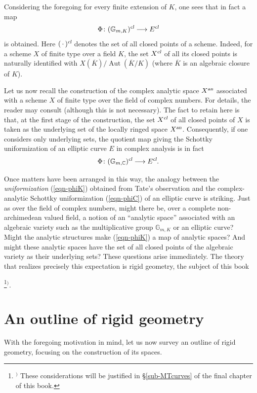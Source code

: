 \documentclass[a4paper,12pt, dvipdfmx]{jsbook}
\def\C{\mathbb{C}}
\def\G{\mathbb{G}}
\def\ovl#1{\overline{#1}}%
\def\cl{\mathop{\textsl{cl}}\nolimits}
\def\Aut{\mathop{\mathrm{Aut}}\nolimits}
\def\an{\textsl{an}}
\theoremstyle{plain}
\theoremstyle{definition}
\newcounter{chushaku}
\def\chu#1{\addtocounter{chushaku}{1}\footnote[\value{chushaku}]{${}^)$ #1}${}^)$}
\begin{document}
Considering the foregoing for every finite extension of $K$, one sees that in fact a map
\begin{equation}\label{eqn-phiK}
\Phi\colon(\G_{m,K})^{\cl}\longrightarrow E^{\cl}
\end{equation}
is obtained.
Here $(\,\cdot\,)^{\cl}$ denotes the set of all closed points of a scheme.
Indeed, for a scheme $X$ of finite type over a field $K$, the set $X^{\cl}$ of all its closed points is naturally identified with $X(\ovl{K})/\Aut(\ovl{K}/K)$ (where $\ovl{K}$ is an algebraic closure of $K$).

Let us now recall the construction of the complex analytic space $X^{\an}$ associated with a scheme $X$ of finite type over the field of complex numbers.
For details, the reader may consult \cite[Expos\'e XII]{SGA1} (although this is not necessary). The fact to retain here is that, at the first stage of the construction, the set $X^{\cl}$ of all closed points of $X$ is taken as the underlying set of the locally ringed space $X^{\an}$.
Consequently, if one considers only underlying sets, the quotient map giving the Schottky uniformization of an elliptic curve $E$ in complex analysis is in fact
\begin{equation}\label{eqn-phiC}
\Phi\colon(\G_{m,\C})^{\cl}\longrightarrow E^{\cl}.
\end{equation}

Once matters have been arranged in this way, the analogy between the {\it uniformization} (\ref{eqn-phiK}) obtained from Tate's observation and the complex-analytic Schottky uniformization (\ref{eqn-phiC}) of an elliptic curve is striking.
Just as over the field of complex numbers, might there be, over a complete non-archimedean valued field, a notion of an ``analytic space'' associated with an algebraic variety such as the multiplicative group $\G_{m,K}$ or an elliptic curve?
Might the analytic structures make (\ref{eqn-phiK}) a map of analytic spaces?
And might these analytic spaces have the set of all closed points of the algebraic variety as their underlying sets?
These questions arise immediately.
The theory that realizes precisely this expectation is rigid geometry, the subject of this book\chu{These considerations will be justified in \S\ref{sub-MTcurves} of the final chapter of this book.}.

\section{An outline of rigid geometry}\label{sec-outlinerigidgeometry}
With the foregoing motivation in mind, let us now survey an outline of rigid geometry, focusing on the construction of its spaces.
\end{document}
